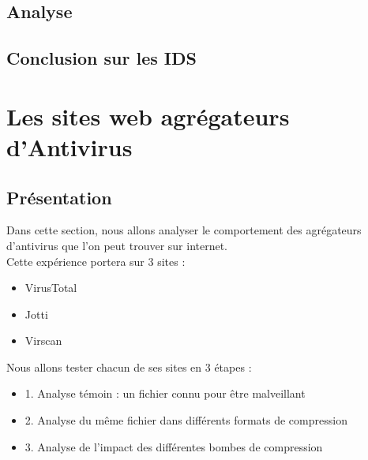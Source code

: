 \documentclass[smallextended]{svjour3}       %
\begin{document}
\subsection{Analyse}
\label{ids:analyse}

\subsection{Conclusion sur les IDS}
\label{ids:conclusion}

\newpage
\section{Les sites web agrégateurs d'Antivirus}
\label{sec2:agrégateurs}


\subsection{Présentation}
\label{agrégateurs:présentation}
Dans cette section, nous allons analyser le comportement des agrégateurs d'antivirus que l'on peut trouver sur internet.\\
Cette expérience portera sur 3 sites : 
\begin{itemize}
\item VirusTotal \cite{virustotal}
\item Jotti \cite{Jotti}
\item Virscan \cite{Virscan}
\end{itemize}
Nous allons tester chacun de ses sites en 3 étapes :
\begin{itemize}
\item 1. Analyse témoin : un fichier connu pour être malveillant
\item 2. Analyse du même fichier dans différents formats de compression
\item 3. Analyse de l'impact des différentes bombes de compression
\end{itemize}
\end{document}
